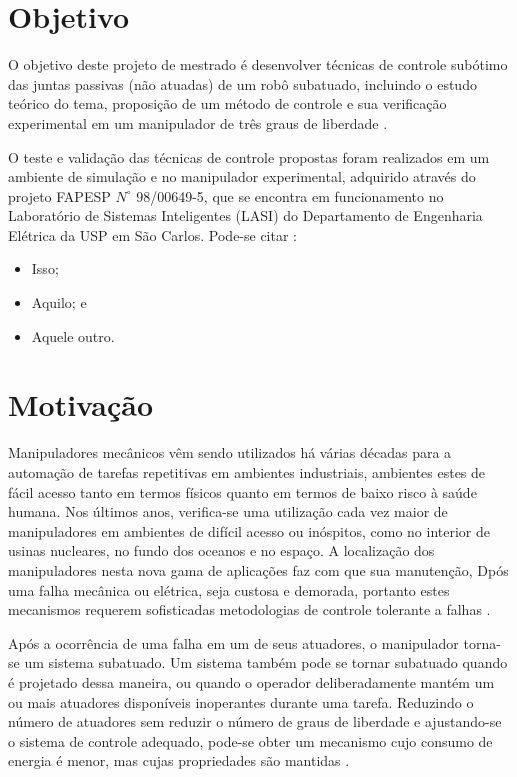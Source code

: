 \section{Objetivo}
O objetivo deste projeto de mestrado é desenvolver técnicas de controle subótimo das juntas passivas (não atuadas) de um robô subatuado, incluindo o estudo teórico do tema, proposição de um método de controle e sua verificação
experimental em um manipulador de três graus de liberdade \cite{Nascimento1970}.

O teste \cite{Patagonios2001} e validação das técnicas de controle propostas foram realizados em um ambiente de simulação e no manipulador
experimental, adquirido através do projeto FAPESP $N^{\circ}$ 98/00649-5, que se encontra em funcionamento no Laboratório de Sistemas Inteligentes (LASI) do Departamento de Engenharia Elétrica da USP em São Carlos. Pode-se citar \cite{Furmento1995}:
\begin{itemize}
\item Isso;
\item Aquilo; e
\item Aquele outro.
\end{itemize}

\section{Motivação}
Manipuladores mecânicos \cite{Sbornian2002} vêm sendo utilizados há várias décadas para a automação de tarefas
repetitivas em ambientes industriais, ambientes estes de fácil acesso tanto em termos físicos quanto em termos de baixo
risco à saúde humana. Nos últimos anos, verifica-se uma utilização cada vez maior de manipuladores em
ambientes de difícil acesso ou inóspitos, como no interior de usinas nucleares, no fundo dos oceanos e no
espaço. A localização dos manipuladores nesta nova gama de aplicações faz com que sua manutenção,
Dpós uma falha mecânica ou elétrica, seja custosa e demorada, portanto estes mecanismos requerem sofisticadas
metodologias de controle tolerante a falhas \cite{ITALUS2004}.

Após a ocorrência de uma falha em um de seus atuadores, o manipulador torna-se um sistema subatuado. Um sistema também pode se tornar subatuado quando é projetado  dessa maneira, ou quando o operador deliberadamente mantém um ou mais atuadores disponíveis inoperantes durante uma tarefa. Reduzindo o número de atuadores sem reduzir o número de graus de
liberdade e ajustando-se o sistema de controle adequado, pode-se obter um mecanismo cujo consumo de energia é menor, mas cujas propriedades são mantidas \cite{Arystides1994}.

